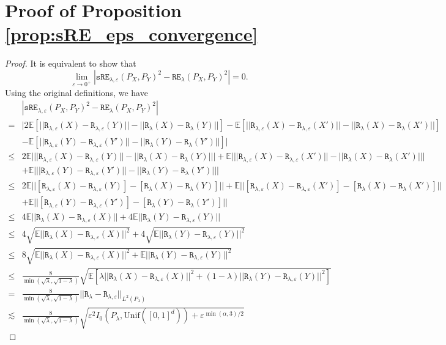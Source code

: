 \documentclass{article}
\theoremstyle{definition}
\newcommand{\sR}{\mathtt{R}_{\lambda,\varepsilon}}
\newcommand{\R}{\mathtt{R}_{\lambda}}
\newcommand{\sRE}{\mathtt{sRE}_{\lambda,\varepsilon}}
\newcommand{\RE}{\mathtt{RE}_{\lambda}}
\begin{document}
\section{Proof of Proposition \ref{prop:sRE_eps_convergence}}

\begin{proof}
    It is equivalent to show that
    \begin{equation*}
         \lim_{\varepsilon \rightarrow 0^+} |\sRE(P_X,P_Y)^2 - \RE(P_X,P_Y)^2| = 0.
    \end{equation*}
    Using the original definitions, we have
    \begin{align*}
        &|\sRE(P_X,P_Y)^2 - \RE(P_X,P_Y)^2| \\
        =& \bigg| 2\mathbb{E} \left [ ||\sR(X) - \sR(Y) || -  ||\R(X) - \R(Y) ||\right ] - \mathbb{E} \left [ ||\sR(X) - \sR(X') || -  ||\R(X) - \R(X') ||\right ]  \\
        &- \mathbb{E} \left [ ||\sR(Y) - \sR(Y') || -  ||\R(Y) - \R(Y') ||\right ]  \bigg |\\ 
        \leq & 2 \mathbb{E} \bigg | ||\sR(X) - \sR(Y) || -  ||\R(X) - \R(Y) || \bigg | + \mathbb{E} \bigg | ||\sR(X) - \sR(X') || -  ||\R(X) - \R(X') || \bigg | \\
        & + \mathbb{E} \bigg | ||\sR(Y) - \sR(Y') || -  ||\R(Y) - \R(Y') || \bigg | \\
        \leq & 2 \mathbb{E} ||[\sR(X) - \sR(Y)] -  [\R(X) - \R(Y)] || + \mathbb{E}  ||[\sR(X) - \sR(X') ] - [\R(X) - \R(X')] || \\
        & + \mathbb{E} ||[\sR(Y) - \sR(Y')] - [\R(Y) - \R(Y')] || \\
        \leq & 4 \mathbb{E} ||\R(X) - \sR(X)|| + 4 \mathbb{E} ||\R(Y) - \sR(Y)||\\
        \leq & 4 \sqrt{\mathbb{E} ||\R(X) - \sR(X)||^2} + 4  \sqrt{\mathbb{E} ||\R(Y) - \sR(Y)||^2} \\
        \leq & 8 \sqrt{\mathbb{E} ||\R(X) - \sR(X)||^2 + \mathbb{E} ||\R(Y) - \sR(Y)||^2} \\
        \leq & \frac{8}{\min(\sqrt{\lambda}, \sqrt{1-\lambda})} \sqrt{\mathbb{E} [\lambda||\R(X) - \sR(X)||^2  + (1-\lambda)||\R(Y) - \sR(Y)||^2]} \\
        = & \frac{8}{\min(\sqrt{\lambda}, \sqrt{1-\lambda})} ||\R - \sR||_{L^2(P_\lambda)} \\
        \lesssim & \frac{8}{\min(\sqrt{\lambda}, \sqrt{1-\lambda})} \sqrt{\varepsilon^2I_0(P_\lambda, \text{Unif}([0,1]^d)) + \varepsilon^{\min(\alpha, 3)/2}}
    \end{align*}

\end{proof}
\end{document}
